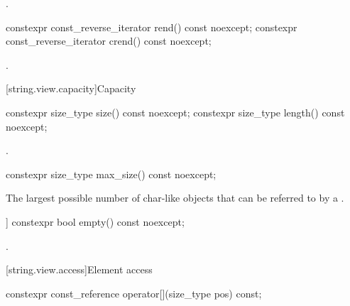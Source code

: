 \begin{itemdescr}
\pnum
\returns
{}.
\end{itemdescr}

%
%
\begin{itemdecl}
constexpr const_reverse_iterator rend() const noexcept;
constexpr const_reverse_iterator crend() const noexcept;
\end{itemdecl}

\begin{itemdescr}
\pnum
\returns
{}.
\end{itemdescr}

[string.view.capacity]{Capacity}

%
%
\begin{itemdecl}
constexpr size_type size() const noexcept;
constexpr size_type length() const noexcept;
\end{itemdecl}

\begin{itemdescr}
\pnum
\returns
{}.
\end{itemdescr}


%
\begin{itemdecl}
constexpr size_type max_size() const noexcept;
\end{itemdecl}

\begin{itemdescr}
\pnum
\returns
The largest possible number of char-like objects that can be referred to by a .
\end{itemdescr}

%
\begin{itemdecl}
[[nodiscard]] constexpr bool empty() const noexcept;
\end{itemdecl}

\begin{itemdescr}
\pnum
\returns
{}.
\end{itemdescr}

[string.view.access]{Element access}

%
\begin{itemdecl}
constexpr const_reference operator[](size_type pos) const;
\end{itemdecl}


